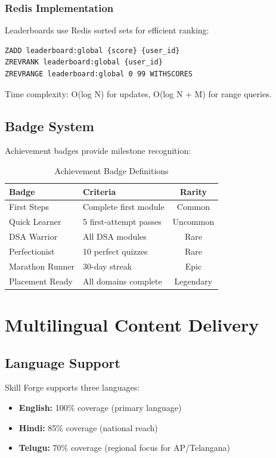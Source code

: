 \documentclass[journal]{IEEEtran}
\begin{document}
\subsubsection{Redis Implementation}
Leaderboards use Redis sorted sets for efficient ranking:
\begin{verbatim}
ZADD leaderboard:global {score} {user_id}
ZREVRANK leaderboard:global {user_id}
ZREVRANGE leaderboard:global 0 99 WITHSCORES
\end{verbatim}

Time complexity: O(log N) for updates, O(log N + M) for range queries.

\subsection{Badge System}

Achievement badges provide milestone recognition:

\begin{table}[htbp]
\caption{Achievement Badge Definitions}
\centering
\begin{tabular}{llc}
\toprule
\textbf{Badge} & \textbf{Criteria} & \textbf{Rarity} \\
\midrule
First Steps & Complete first module & Common \\
Quick Learner & 5 first-attempt passes & Uncommon \\
DSA Warrior & All DSA modules & Rare \\
Perfectionist & 10 perfect quizzes & Rare \\
Marathon Runner & 30-day streak & Epic \\
Placement Ready & All domains complete & Legendary \\
\bottomrule
\end{tabular}
\end{table}

\section{Multilingual Content Delivery}
\label{sec:multilingual}

\subsection{Language Support}

Skill Forge supports three languages:
\begin{itemize}
    \item \textbf{English:} 100\% coverage (primary language)
    \item \textbf{Hindi:} 85\% coverage (national reach)
    \item \textbf{Telugu:} 70\% coverage (regional focus for AP/Telangana)
\end{itemize}
\end{document}
